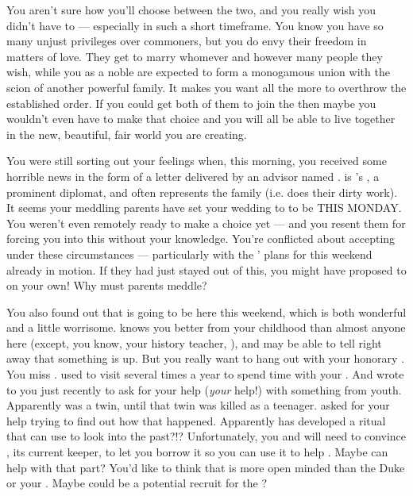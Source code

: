 \documentclass[char]{GL2020}
\begin{document}
You aren't sure how you'll choose between the two, and you really wish you didn't have to — especially in such a short timeframe. You know you have so many unjust privileges over commoners, but you do envy their freedom in matters of love. They get to marry whomever and however many people they wish, while you as a noble are expected to form a monogamous union with the scion of another powerful family. It makes you want all the more to overthrow the established order. If you could get both of them to join the \pGoaties{} then maybe you wouldn’t even have to make that choice and you will all be able to live together in the new, beautiful, fair world you are creating.
 
You were still sorting out your feelings when, this morning, you received some horrible news in the form of a letter delivered by an advisor named \cDiplomat{\intro}. \cDiplomat{} is \cHeir{}’s \cDiplomat{\auncle}, a prominent diplomat, and often represents the family (i.e. does their dirty work). It seems your meddling parents have set your wedding to \cHeir{} to be THIS MONDAY. You weren't even remotely ready to make a choice yet — and you resent them for forcing you into this without your knowledge. You're conflicted about accepting under these circumstances — particularly with the \pGoaties{}’ plans for this weekend already in motion. If they had just stayed out of this, you might have proposed to \cHeir{} on your own!  Why must parents meddle?

You also found out that \cWildCard{} is going to be here this weekend, which is both wonderful and a little worrisome. \cWildCard{} knows you better from your childhood than almost anyone here (except, you know, your history teacher, \cHistory{}), and may be able to tell right away that something is up. But you really want to hang out with your honorary \cWildCard{\auncle}. You miss \cWildCard{\them}. \cWildCard{\They} used to visit several times a year to spend time with your \cWildCardFriend{\parent}. And \cWildCard{\they} wrote to you just recently to ask for your help (\emph{your} help!) with something from \cWildCard{\their} youth. Apparently \cWildCard{} was a twin, until that twin was killed as a teenager. \cWildCard{\Theyhave} asked for your help trying to find out how that happened. Apparently \cWildCard{} has developed a ritual that can use \iMirror{} to look into the past?!? Unfortunately, you and \cWildCard{} will need to convince \cDiplomat{}, its current keeper,  to let you borrow it so you can use it to help \cWildCard{}. Maybe \cHeir{} can help with that part? You’d like to think that \cWildCard{} is more open minded than the Duke or your \cWildCardFriend{\parent}. Maybe \cWildCard{} could be a potential recruit for the \pGoaties{}?  
\end{document}
